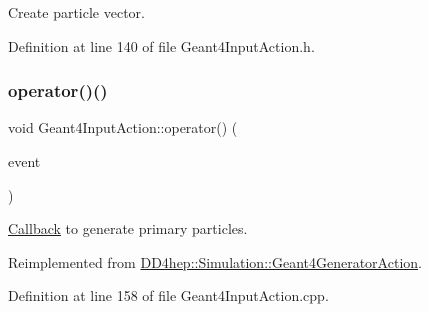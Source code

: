 Create particle vector. 



Definition at line 140 of file Geant4\+Input\+Action.\+h.

\hypertarget{class_d_d4hep_1_1_simulation_1_1_geant4_input_action_abda8423a68e04eec20eb52c01883c0ba}{}\label{class_d_d4hep_1_1_simulation_1_1_geant4_input_action_abda8423a68e04eec20eb52c01883c0ba} 
\subsubsection{\texorpdfstring{operator()()}{operator()()}}
{\footnotesize\ttfamily void Geant4\+Input\+Action\+::operator() (\begin{DoxyParamCaption}\item[{G4\+Event $\ast$}]{event }\end{DoxyParamCaption})\hspace{0.3cm}{\ttfamily [virtual]}}



\hyperlink{class_d_d4hep_1_1_callback}{Callback} to generate primary particles. 



Reimplemented from \hyperlink{class_d_d4hep_1_1_simulation_1_1_geant4_generator_action_ac5a1d2335a19e3f9d555081199e01801}{D\+D4hep\+::\+Simulation\+::\+Geant4\+Generator\+Action}.



Definition at line 158 of file Geant4\+Input\+Action.\+cpp.



